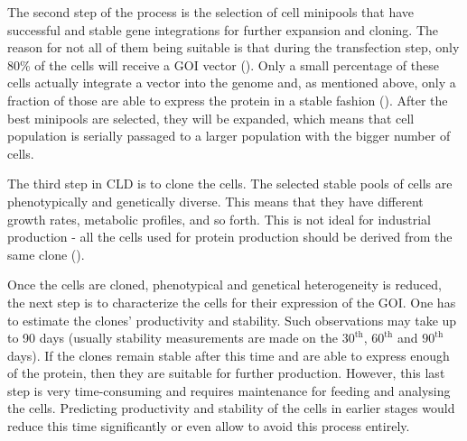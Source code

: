 The second step of the process is the selection of cell minipools that have successful and stable gene integrations for further expansion and cloning. The reason for not all of them being suitable is that during the transfection step, only 80\% of the cells will receive a GOI vector (\cite{Castan_2018}). Only a small percentage of these cells actually integrate a vector into the genome and, as mentioned above, only a fraction of those are able to express the protein in a stable fashion (\cite{Shin_2020}). After the best minipools are selected, they will be expanded, which means that cell population is serially passaged to a larger population with the bigger number of cells.

The third step in CLD is to clone the cells. The selected stable pools of cells are phenotypically and genetically diverse. This means that they have different growth rates, metabolic profiles, and so forth. This is not ideal for industrial production - all the cells used for protein production should be derived from the same clone (\cite{ema_2020}). 

Once the cells are cloned, phenotypical and genetical heterogeneity is reduced, the next step is to characterize the cells for their expression of the GOI. One has to estimate the clones' productivity and stability. Such observations may take up to 90 days (usually stability measurements are made on the $30^{\text{th}}$, $60^{\text{th}}$ and $90^{\text{th}}$ days). If the clones remain stable after this time and are able to express enough of the protein, then they are suitable for further production. However, this last step is very time-consuming and requires maintenance for feeding and analysing the cells. Predicting productivity and stability of the cells in earlier stages would reduce this time significantly or even allow to avoid this process entirely.